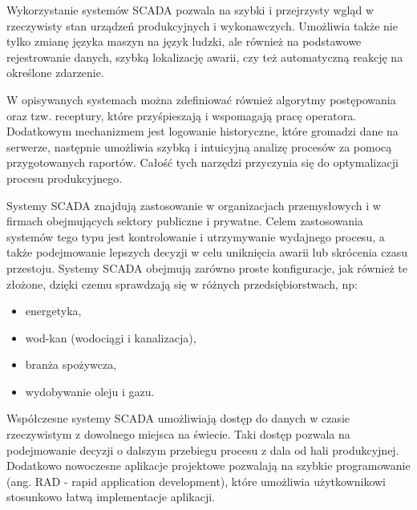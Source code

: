 Wykorzystanie systemów SCADA pozwala na szybki i przejrzysty wgląd w rzeczywisty stan urządzeń produkcyjnych i wykonawczych. Umożliwia także nie tylko zmianę języka maszyn na język ludzki, ale również na podstawowe rejestrowanie danych, szybką lokalizację awarii, czy też automatyczną reakcję na określone zdarzenie. 

W opisywanych systemach można zdefiniować również algorytmy postępowania oraz tzw. receptury, które przyśpieszają i wspomagają pracę operatora. Dodatkowym mechanizmem jest logowanie historyczne, które gromadzi dane na serwerze, następnie umożliwia szybką i intuicyjną analizę procesów za pomocą przygotowanych raportów. Całość tych narzędzi przyczynia się do optymalizacji procesu produkcyjnego.  



Systemy SCADA znajdują zastosowanie w organizacjach przemysłowych i w firmach obejmujących sektory publiczne i prywatne. Celem zastosowania systemów tego typu jest kontrolowanie i utrzymywanie wydajnego procesu, a także podejmowanie lepszych decyzji w celu uniknięcia awarii lub skrócenia czasu przestoju. Systemy SCADA obejmują zarówno proste konfiguracje, jak również te złożone, dzięki czemu sprawdzają się w różnych przedsiębiorstwach, np:

\begin{itemize}
	\item energetyka,
	\item wod-kan (wodociągi i kanalizacja),
	\item branża spożywcza,
	\item wydobywanie oleju i gazu. 
\end{itemize}





Współczesne systemy SCADA umożliwiają dostęp do danych w czasie rzeczywistym z dowolnego miejsca na świecie. Taki dostęp pozwala na podejmowanie decyzji o dalszym przebiegu procesu z dala od hali produkcyjnej. Dodatkowo nowoczesne aplikacje projektowe pozwalają na szybkie programowanie (ang. RAD - rapid application development), które umożliwia użytkownikowi stosunkowo łatwą implementacje aplikacji.



